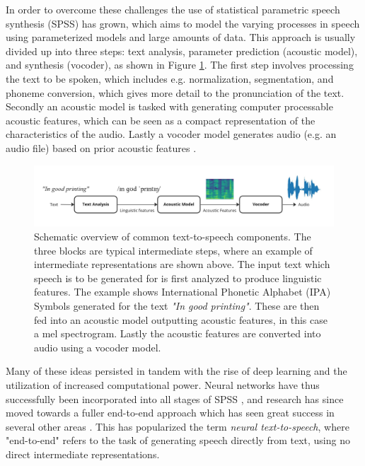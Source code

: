 \documentclass{report}
\begin{document}
In order to overcome these challenges the use of statistical parametric speech synthesis (SPSS) has grown, which aims to model the varying processes in speech using parameterized models and large amounts of data. This approach is usually divided up into three steps: text analysis, parameter prediction (acoustic model), and synthesis (vocoder), as shown in Figure \ref{fig:TTS}. The first step involves processing the text to be spoken, which includes e.g. normalization, segmentation, and phoneme conversion, which gives more detail to the pronunciation of the text. Secondly an acoustic model is tasked with generating computer processable acoustic features, which can be seen as a compact representation of the characteristics of the audio. Lastly a vocoder model generates audio (e.g. an audio file) based on prior acoustic features \cite{zen2009statistical, tan2021survey}. 
\begin{figure}[H]
    \centering
    \includegraphics[scale=0.28]{images/TTS.jpg}
    \caption{\onehalfspacing Schematic overview of common text-to-speech components. The three blocks are typical intermediate steps, where an example of intermediate representations are shown above. The input text which speech is to be generated for is first analyzed to produce linguistic features. The example shows International Phonetic Alphabet (IPA) Symbols generated for the text \textit{"In good printing"}. These are then fed into an acoustic model outputting acoustic features, in this case a mel spectrogram. Lastly the acoustic features are converted into audio using a vocoder model.}
    \label{fig:TTS}
\end{figure}
Many of these ideas persisted in tandem with the rise of deep learning and the utilization of increased computational power. Neural networks have thus successfully been incorporated into all stages of SPSS \cite{ze2013statistical, arik2017deep}, and research has since moved towards a fuller end-to-end approach \cite{oord2016wavenet} which has seen great success in several other areas  \cite{krizhevsky2017imagenet, bojarski2016end, zhou2018voxelnet}. This has popularized the term \textit{neural text-to-speech}, where "end-to-end" refers to the task of generating speech directly from text, using no direct intermediate representations.
\end{document}
